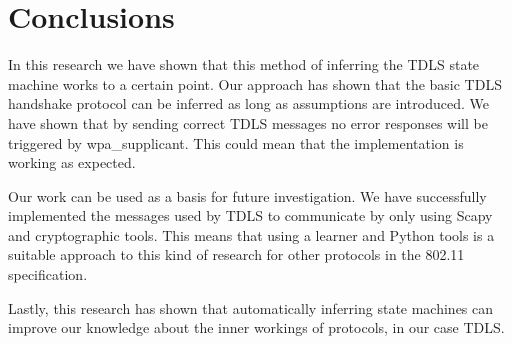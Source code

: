 \chapter{Conclusions}\label{conclusions}
\iffalse
In this chapter you present all conclusions that can be drawn from the
preceding chapters.
It should not introduce new experiments, theories, investigations, etc.:
these should have been written down earlier in the thesis.
Therefore, conclusions can be brief and to the point.
\fi

In this research we have shown that this method of inferring the TDLS state machine works to a certain point. Our approach has shown that the basic TDLS handshake protocol can be inferred as long as assumptions are introduced. We have shown that by sending correct TDLS messages no error responses will be triggered by wpa\_supplicant. This could mean that the implementation is working as expected.

Our work can be used as a basis for future investigation. We have successfully implemented the messages used by TDLS to communicate by only using Scapy and cryptographic tools. This means that using a learner and Python tools is a suitable approach to this kind of research for other protocols in the 802.11 specification.

Lastly, this research has shown that automatically inferring state machines can improve our knowledge about the inner workings of protocols, in our case TDLS.